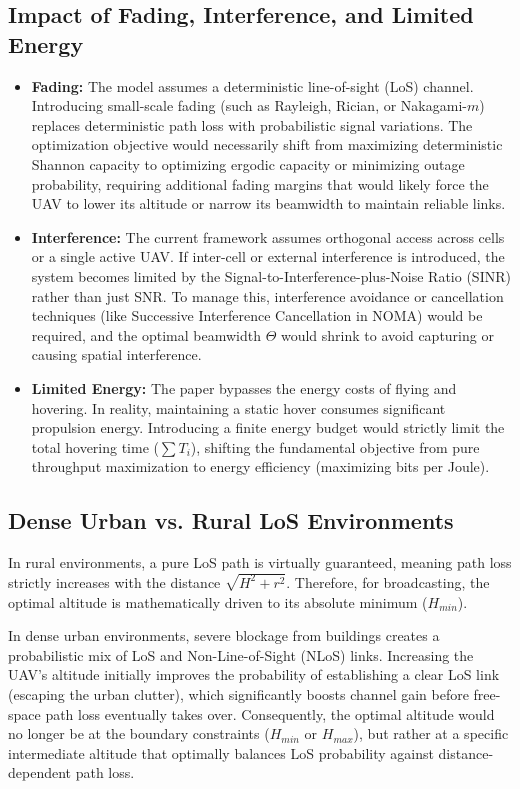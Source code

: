 \documentclass[11pt,a4paper]{article}
\begin{document}
    \subsection{Impact of Fading, Interference, and Limited Energy}
    \begin{itemize}
        \item \textbf{Fading:} The model assumes a deterministic line-of-sight (LoS) channel.
        Introducing small-scale fading (such as Rayleigh, Rician, or Nakagami-$m$) replaces deterministic path loss with probabilistic signal variations.
        The optimization objective would necessarily shift from maximizing deterministic Shannon capacity to optimizing ergodic capacity or minimizing outage probability,
        requiring additional fading margins that would likely force the UAV to lower its altitude or narrow its beamwidth to maintain reliable links.
        \item \textbf{Interference:} The current framework assumes orthogonal access across cells or a single active UAV.
        If inter-cell or external interference is introduced, the system becomes limited by the Signal-to-Interference-plus-Noise Ratio (SINR) rather than just SNR.
        To manage this, interference avoidance or cancellation techniques (like Successive Interference Cancellation in NOMA) would be required,
        and the optimal beamwidth $\Theta$ would shrink to avoid capturing or causing spatial interference.
        \item \textbf{Limited Energy:} The paper bypasses the energy costs of flying and hovering.
        In reality, maintaining a static hover consumes significant propulsion energy.
        Introducing a finite energy budget would strictly limit the total hovering time ($\sum T_i$),
        shifting the fundamental objective from pure throughput maximization to energy efficiency (maximizing bits per Joule).
    \end{itemize}

    \subsection{Dense Urban vs. Rural LoS Environments}
    In rural environments, a pure LoS path is virtually guaranteed, meaning path loss strictly increases with the distance $\sqrt{H^2 + r^2}$.
    Therefore, for broadcasting, the optimal altitude is mathematically driven to its absolute minimum ($H_{min}$).

    In dense urban environments, severe blockage from buildings creates a probabilistic mix of LoS and Non-Line-of-Sight (NLoS) links.
    Increasing the UAV's altitude initially improves the probability of establishing a clear LoS link (escaping the urban clutter),
    which significantly boosts channel gain before free-space path loss eventually takes over. Consequently,
    the optimal altitude would no longer be at the boundary constraints ($H_{min}$ or $H_{max}$), but rather at a specific intermediate altitude
    that optimally balances LoS probability against distance-dependent path loss.
\end{document}
